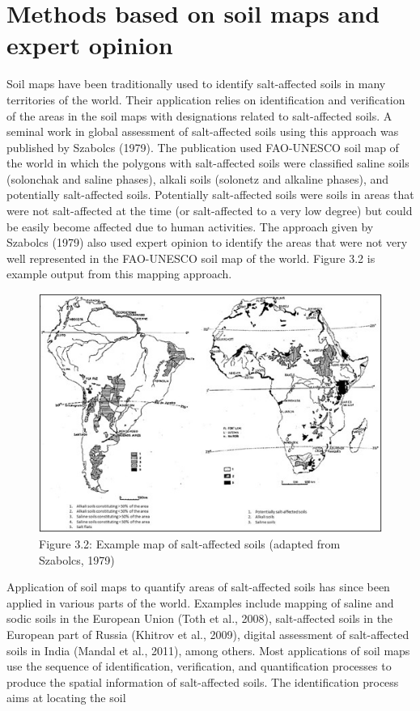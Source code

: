 \documentclass[
  10pt,
  b5paper,
]{book}
\begin{document}
\hypertarget{methods-based-on-soil-maps-and-expert-opinion}{%
\section{Methods based on soil maps and expert opinion}\label{methods-based-on-soil-maps-and-expert-opinion}}

Soil maps have been traditionally used to identify salt-affected soils in many territories of the world. Their application relies on identification and verification of the areas in the soil maps with designations related to salt-affected soils. A seminal work in global assessment of salt-affected soils using this approach was published by Szabolcs (1979). The publication used FAO-UNESCO soil map of the world in which the polygons with salt-affected soils were classified saline soils (solonchak and saline phases), alkali soils (solonetz and alkaline phases), and potentially salt-affected soils. Potentially salt-affected soils were soils in areas that were not salt-affected at the time (or salt-affected to a very low degree) but could be easily become affected due to human activities. The approach given by Szabolcs (1979) also used expert opinion to identify the areas that were not very well represented in the FAO-UNESCO soil map of the world. Figure
3.2 is example output from this mapping approach.

\begin{figure}
\centering
\includegraphics{figures/images/Figure3.2.jpg}
\caption{Figure 3.2: Example map of salt-affected soils (adapted from Szabolcs, 1979)}
\end{figure}

Application of soil maps to quantify areas of salt-affected soils has since been applied in various parts of the world. Examples include mapping of saline and sodic soils in the European Union (Toth et al., 2008), salt-affected soils in the European part of Russia (Khitrov et al., 2009), digital assessment of salt-affected soils in India (Mandal et al., 2011), among others.
Most applications of soil maps use the sequence of identification, verification, and quantification processes to produce the spatial information of salt-affected soils. The identification process aims at locating the soil
\end{document}
